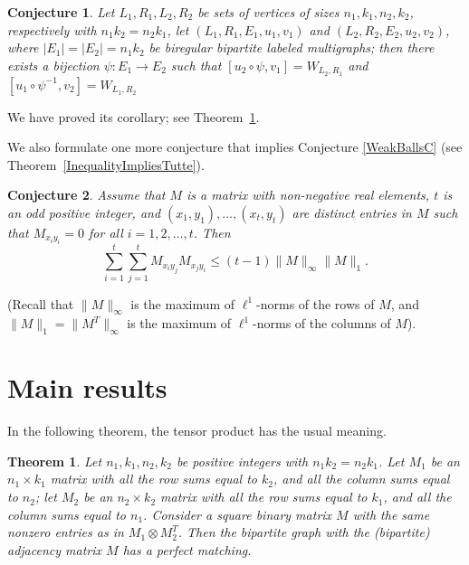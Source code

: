 \documentclass[12pt]{article}
\newtheorem{conjecture}{Conjecture}
\newtheorem{theorem}{Theorem}
\theoremstyle{definition}
\theoremstyle{plain}
\renewcommand{\leq}{\leqslant}
\begin{document}
\medskip 

\begin{conjecture}\label{4PartsC}
Let $L_1,R_1,L_2,R_2$ be sets of vertices of sizes $n_1,k_1,n_2,k_2$, respectively with $n_1 k_2 = n_2 k_1$, let $(L_1,R_1,E_1,u_1,v_1)$ and $(L_2,R_2,E_2,u_2,v_2)$, where $|E_1|=|E_2|=n_1 k_2$ be biregular bipartite labeled multigraphs;
then there exists a bijection $\psi: E_1 \rightarrow E_2$ such that $[u_2 \circ \psi, v_1] = W_{L_2, R_1}$ and  $[u_1 \circ \psi^{-1}, v_2] = W_{L_1, R_2}$

\end{conjecture}

We have proved its corollary; see Theorem~\ref{Weak4PartsT}.

We also formulate one more conjecture that implies Conjecture \ref{WeakBallsC} (see Theorem~\ref{InequalityImpliesTutte}).

\begin{conjecture}\label{MatrixInequalityC}
Assume that $M$ is a matrix with non-negative real elements, $t$ is an odd positive integer, and $(x_1, y_1), \dots, (x_t, y_t)$ are distinct entries in $M$ such that $M_{x_i y_i} = 0$ for all $i=1,2,\dots,t$. Then 
$$
  \sum_{i=1}^{t} \sum_{j=1}^t M_{x_i y_j} M_{x_j y_i} \leq (t-1)\|M\|_{\infty}\|M\|_{1}.
$$
\end{conjecture} 

(Recall that $\|M\|_\infty$ is the maximum of $\ell^1$-norms of the rows
of $M$, and $\|M\|_1=\|M^T\|_\infty$ is the maximum of $\ell^1$-norms
of the columns of $M$).

\section{Main results}

In the following theorem, the tensor product has the usual meaning. 

\begin{theorem}\label{Weak4PartsT}
Let $n_1, k_1, n_2, k_2$ be positive integers with $n_1 k_2 = n_2 k_1$. Let $M_1$ be an $n_1 \times k_1$ matrix with all the row sums equal to $k_2$, and all the column sums equal to $n_2$; let $M_2$ be an $n_2 \times k_2$ matrix with all the row sums equal to $k_1$, and all the column sums equal to $n_1$. Consider a square binary matrix $M$ with the same nonzero entries as in $M_1 \otimes M_2^T$. Then the bipartite graph with the (bipartite) adjacency matrix $M$ has a perfect matching.
\end{theorem}
\end{document}
